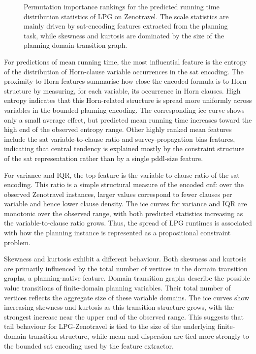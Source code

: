 {\begin{figure}[!tbp]
    \caption[Permutation importance for LPG on Zenotravel]{Permutation importance rankings for the predicted running time distribution statistics of LPG on Zenotravel. The scale statistics are mainly driven by \gls{sat}-encoding features extracted from the planning task, while skewness and kurtosis are dominated by the size of the planning domain-transition graph.}
    \label{fig:lpg_zeno_permut}
\end{figure}

For predictions of mean running time, the most influential feature is the entropy of the distribution of Horn-clause variable occurrences in the \gls{sat} encoding.
The proximity-to-Horn features summarise how close the encoded formula is to Horn structure by measuring, for each variable, its occurrence in Horn clauses.
High entropy indicates that this Horn-related structure is spread more uniformly across variables in the bounded planning encoding.
The corresponding \gls{ice} curve shows only a small average effect, but predicted mean running time increases toward the high end of the observed entropy range.
Other highly ranked mean features include the \gls{sat} variable-to-clause ratio and survey-propagation bias features, indicating that central tendency is explained mostly by the constraint structure of the \gls{sat} representation rather than by a single \gls{pddl}-size feature.

For variance and IQR, the top feature is the variable-to-clause ratio of the \gls{sat} encoding.
This ratio is a simple structural measure of the encoded \gls{cnf}: over the observed Zenotravel instances, larger values correspond to fewer clauses per variable and hence lower clause density.
The \gls{ice} curves for variance and IQR are monotonic over the observed range, with both predicted statistics increasing as the variable-to-clause ratio grows.
Thus, the spread of LPG runtimes is associated with how the planning instance is represented as a propositional constraint problem.

Skewness and kurtosis exhibit a different behaviour.
Both skewness and kurtosis are primarily influenced by the total number of vertices in the domain transition graphs, a planning-native feature.
Domain transition graphs describe the possible value transitions of finite-domain planning variables. Their total number of vertices reflects the aggregate size of these variable domains.
The \gls{ice} curves show increasing skewness and kurtosis as this transition structure grows, with the strongest increase near the upper end of the observed range.
This suggests that tail behaviour for LPG-Zenotravel is tied to the size of the underlying finite-domain transition structure, while mean and dispersion are tied more strongly to the bounded \gls{sat} encoding used by the feature extractor.


}
